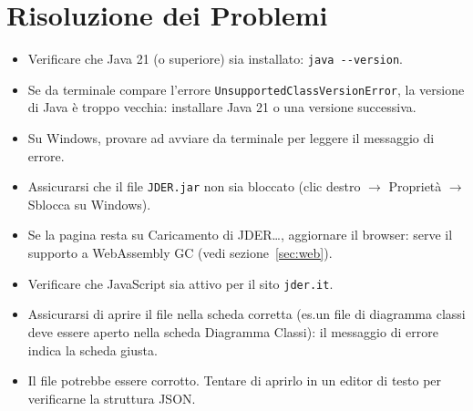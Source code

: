 \documentclass[a4paper,11pt]{article}
\newcommand\mediumweight{\fontseries{mb}\selectfont}
\newcommand\uielement[1]{{\mediumweight #1}}
\begin{document}
\section{Risoluzione dei Problemi}
\label{sec:troubleshooting}

\begin{tcolorbox}[warnbox, title={L'applicazione non si avvia}]
  \begin{itemize}
    \item Verificare che Java 21 (o superiore) sia installato: \texttt{java -{}-version}.
    \item Se da terminale compare l'errore \texttt{UnsupportedClassVersionError}, la versione di
          Java è troppo vecchia: installare Java 21 o una versione successiva.
    \item Su Windows, provare ad avviare da terminale per leggere il messaggio di errore.
    \item Assicurarsi che il file \texttt{JDER.jar} non sia bloccato (clic destro
          $\to$ Proprietà $\to$ Sblocca su Windows).
  \end{itemize}
\end{tcolorbox}

\begin{tcolorbox}[warnbox, title={La versione web non si avvia}]
  \begin{itemize}
    \item Se la pagina resta su \uielement{Caricamento di JDER\ldots}, aggiornare il browser:
          serve il supporto a WebAssembly GC (vedi sezione~\ref{sec:web}).
    \item Verificare che JavaScript sia attivo per il sito \texttt{jder.it}.
  \end{itemize}
\end{tcolorbox}

\begin{tcolorbox}[warnbox, title={Il file salvato non si apre}]
  \begin{itemize}
    \item Assicurarsi di aprire il file nella scheda corretta (es.\@ un file di diagramma classi
          deve essere aperto nella scheda \uielement{Diagramma Classi}): il messaggio di errore
          indica la scheda giusta.
    \item Il file potrebbe essere corrotto. Tentare di aprirlo in un editor di testo
          per verificarne la struttura JSON.
  \end{itemize}
\end{tcolorbox}
\end{document}
